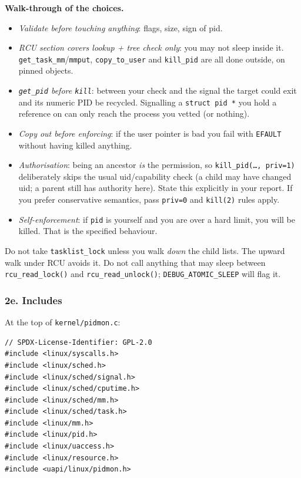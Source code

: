 \documentclass[11pt,a4paper]{article}
\newcommand{\kfile}[1]{\texttt{\small #1}}
\begin{document}
\textbf{Walk-through of the choices.}
\begin{itemize}
  \item \emph{Validate before touching anything}: flags, size, sign of pid.
  \item \emph{RCU section covers lookup + tree check only}: you may not sleep inside it. \texttt{get\_task\_mm}/\texttt{mmput}, \texttt{copy\_to\_user} and \texttt{kill\_pid} are all done outside, on pinned objects.
  \item \emph{\texttt{get\_pid} before \texttt{kill}}: between your check and the signal the target could exit and its numeric PID be recycled. Signalling a \texttt{struct pid *} you hold a reference on can only reach the process you vetted (or nothing).
  \item \emph{Copy out before enforcing}: if the user pointer is bad you fail with \texttt{EFAULT} without having killed anything.
  \item \emph{Authorisation}: being an ancestor \emph{is} the permission, so \texttt{kill\_pid(\dots, priv=1)} deliberately skips the usual uid/capability check (a child may have changed uid; a parent still has authority here). State this explicitly in your report. If you prefer conservative semantics, pass \texttt{priv=0} and \texttt{kill(2)} rules apply.
  \item \emph{Self-enforcement}: if \texttt{pid} is yourself and you are over a hard limit, you will be killed. That is the specified behaviour.
\end{itemize}

\begin{warn}
Do not take \texttt{tasklist\_lock} unless you walk \emph{down} the child lists. The upward walk under RCU avoids it. Do not call anything that may sleep between \texttt{rcu\_read\_lock()} and \texttt{rcu\_read\_unlock()}; \texttt{DEBUG\_ATOMIC\_SLEEP} will flag it.
\end{warn}

\subsubsection*{2e. Includes}
At the top of \kfile{kernel/pidmon.c}:
\begin{lstlisting}
// SPDX-License-Identifier: GPL-2.0
#include <linux/syscalls.h>
#include <linux/sched.h>
#include <linux/sched/signal.h>
#include <linux/sched/cputime.h>
#include <linux/sched/mm.h>
#include <linux/sched/task.h>
#include <linux/mm.h>
#include <linux/pid.h>
#include <linux/uaccess.h>
#include <linux/resource.h>
#include <uapi/linux/pidmon.h>
\end{lstlisting}
\end{document}
